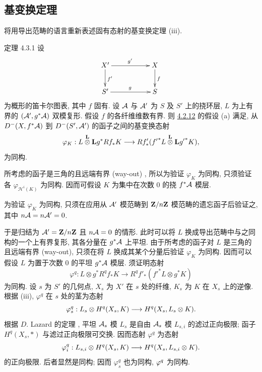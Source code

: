 \subsection{基变换定理}\pageoriginale

将用导出范畴的语言重新表述固有态射的基变换定理  (iii).

\begin{enonce*}{定理 4.3.1}
设
\[
\xymatrix{
X' \ar[rr]^{g'} \ar[d]^{f'}&& X\ar[d]^{f}\\
S' \ar[rr]^{g}& & S
}
\]
为概形的笛卡尔图表, 其中 $f$ 固有. 设 ${\mathcal A}$ 与 ${\mathcal A}'$ 为 $S$ 及 $S'$ 上的挠环层, $L$ 为上有界的 $({\mathcal A}',g^{\ast}{\mathcal A})$ 双模复形. 假设 $f$ 的各纤维维数有界. 则 \hyperref[XVII.subsubsec4.2.12]{4.2.12} 的假设 {\rm(a)} 满足, 从 $D^{-}(X,f^{\ast}{\mathcal A})$ 到 $D^{-}(S',{\mathcal A}')$ 的函子之间的基变换态射 
\[
\varphi_K:L\overset{\mathbf{L}}{\otimes}\mathbf{L} g^{\ast}Rf_*K\longrightarrow
Rf'_{\ast}({f'}^{\ast}L\overset{\mathbf{L}}{\otimes}\mathbf{L}{g'}^{\ast}K){},
\]
为同构.
\end{enonce*}

所考虑的函子是三角的且远端有界 (way-out) \cite[I 7]{sga4.exp.XVII.bib.RD}, 所以为验证 $\varphi_{K}$ 为同构, 只须验证各 $\varphi_{ℋ^{i}(K)}$ 为同构. 因而可假设 $K$ 为集中在次数 $0$ 的挠 $f^{\ast}{\mathcal A}$ 模层.

为\pageoriginale 验证 $\varphi_{K}$ 为同构, 只须在应用从 ${\mathcal A}'$ 模范畴到 $\mathbf{Z}/n\mathbf{Z}$ 模范畴的遗忘函子后验证之, 其中 $n{\mathcal A}=n{\mathcal A}'=0$.

于是归结为 ${\mathcal A}'=\mathbf{Z}/n\mathbf{Z}$ 且 $n{\mathcal A}=0$ 的情形. 此时可以将 $L$ 换成导出范畴中与之同构的一个上有界复形, 其各分量在 $g^{\ast}{\mathcal A}$ 上平坦. 由于所考虑的函子对 $L$ 是三角的且远端有界 (way-out), 只须在将 $L$ 换成其某个分量后验证 $\varphi_{K}$ 为同构. 因而可以假设 $L$ 为置于次数 $0$ 的平坦 $g^{\ast}{\mathcal A}$ 模层. 须证明态射
\[
\varphi^{q}:L\otimes g^{\ast}R^{q}f_{\ast}K\longrightarrow
R^{q}f'_{\ast}({f'}^{\ast}L\otimes g^{\ast}K)
\]
为同构. 设 $s$ 为 $S'$ 的几何点, $X_s$ 为 $X'$ 在 $s$ 处的纤维, $K_s$ 为 $K$ 在 $X_s$ 上的逆像. 根据  (iii), $\varphi^{q}$ 在 $s$ 处的茎为态射
\[
\varphi^{q}_s:L_{s}\otimes H^{q}(X_s,K)\longrightarrow H^{q}(X_s,
L_s\otimes K){}.
\]
根据 $D$. Lazard 的定理 \cite{sga4.exp.XVII.bib.La}, 平坦 ${\mathcal A}_s$ 模 $L_s$ 是自由 ${\mathcal A}_s$ 模 $L_{s,i}$ 的滤过正向极限; 函子 $H^{q}(X_s,\ast)$ 与滤过正向极限可交换. 因而态射 $\varphi^{q}$ 为态射
\[
\varphi^{q}_i:L_{s,i}\otimes H^{q}(X_s,K)\longrightarrow H^{q}(X_s,
L_{s,i}\otimes K){}.
\]
的正向极限. 后者显然是同构; 因而 $\varphi^{q}_s$ 也为同构, $\varphi^q$ 为同构.

